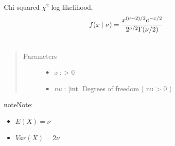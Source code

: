 \documentclass[letterpaper,10pt,english]{sphinxmanual}
\begin{document}
\begin{fulllineitems}
\label{distributions:pymc.distributions.chi2_like}
Chi-squared $\chi^2$ log-likelihood.
\begin{gather}
\begin{split}f(x \mid \nu) = \frac{x^{(\nu-2)/2}e^{-x/2}}{2^{\nu/2}\Gamma(\nu/2)}\end{split}\notag\\\begin{split}\end{split}\notag
\end{gather}\begin{quote}\begin{description}
\item[{Parameters }] \leavevmode\begin{itemize}
\item {} 
\emph{x} : \textgreater{} 0

\item {} 
\emph{nu} : {[}int{]} Degrees of freedom ( nu \textgreater{} 0 )

\end{itemize}

\end{description}\end{quote}

\begin{notice}{note}{Note:}\begin{itemize}
\item {} 
$E(X)=\nu$

\item {} 
$Var(X)=2\nu$

\end{itemize}
\end{notice}

\end{fulllineitems}

\end{document}
